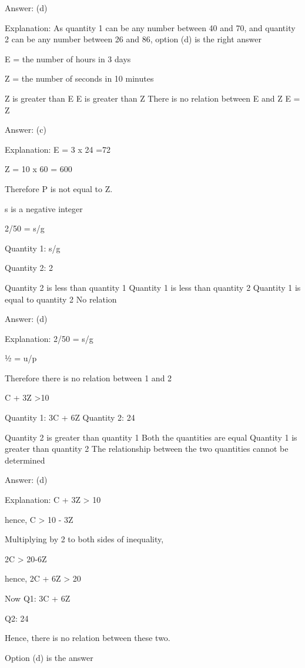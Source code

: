     Answer: (d)

    Explanation: As quantity 1 can be any number between 40 and 70, and quantity 2 can be any number between 26 and 86, option (d) is the right answer

    E = the number of hours in 3 days

    Z = the number of seconds in 10 minutes

        Z is greater than E
        E is greater than Z
        There is no relation between E and Z
        E = Z

    Answer: (c)

    Explanation: E = 3 x 24 =72

    Z = 10 x 60 = 600

    Therefore P is not equal to Z.

    s is a negative integer

    2/50 = s/g

    Quantity 1: s/g

    Quantity 2: 2

        Quantity 2 is less than quantity 1
        Quantity 1 is less than quantity 2
        Quantity 1 is equal to quantity 2
        No relation

    Answer: (d)

    Explanation: 2/50 = s/g

    ½ = u/p

    Therefore there is no relation between 1 and 2

    C + 3Z >10

    Quantity 1: 3C + 6Z Quantity 2: 24

        Quantity 2 is greater than quantity 1
        Both the quantities are equal
        Quantity 1 is greater than quantity 2
        The relationship between the two quantities cannot be determined

    Answer: (d)

    Explanation:  C + 3Z > 10

    hence, C > 10 - 3Z

    Multiplying by 2 to both sides of inequality,

    2C > 20-6Z

    hence, 2C + 6Z > 20

    Now Q1: 3C + 6Z

    Q2: 24

    Hence, there is no relation between these two.

    Option (d) is the answer

